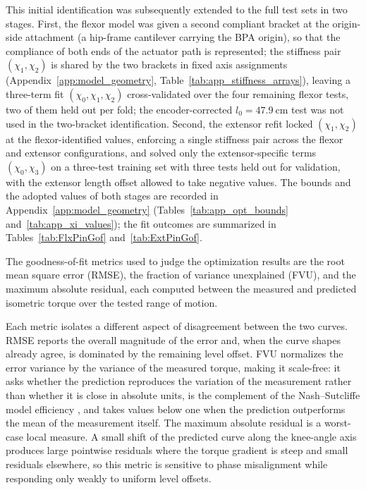 This initial identification was subsequently extended to the full test sets in two stages. First, the flexor model was given a second compliant bracket at the origin-side attachment (a hip-frame cantilever carrying the BPA origin), so that the compliance of both ends of the actuator path is represented; the stiffness pair $(\chi_{1}, \chi_{2})$ is shared by the two brackets in fixed axis assignments (Appendix~\ref{app:model_geometry}, Table~\ref{tab:app_stiffness_arrays}), leaving a three-term fit $(\chi_{0}, \chi_{1}, \chi_{2})$ cross-validated over the four remaining flexor tests, two of them held out per fold; the encoder-corrected $l_{0}=\qty{47.9}{\cm}$ test was not used in the two-bracket identification. Second, the extensor refit locked $(\chi_{1}, \chi_{2})$ at the flexor-identified values, enforcing a single stiffness pair across the flexor and extensor configurations, and solved only the extensor-specific terms $(\chi_{0}, \chi_{3})$ on a three-test training set with three tests held out for validation, with the extensor length offset allowed to take negative values. The bounds and the adopted values of both stages are recorded in Appendix~\ref{app:model_geometry} (Tables~\ref{tab:app_opt_bounds} and~\ref{tab:app_xi_values}); the fit outcomes are summarized in Tables~\ref{tab:FlxPinGof} and~\ref{tab:ExtPinGof}.

The goodness-of-fit metrics used to judge the optimization results are the root mean square error (RMSE), the fraction of variance unexplained (FVU), and the maximum absolute residual, each computed between the measured and predicted isometric torque over the tested range of motion.

Each metric isolates a different aspect of disagreement between the two curves. RMSE reports the overall magnitude of the error and, when the curve shapes already agree, is dominated by the remaining level offset. FVU normalizes the error variance by the variance of the measured torque, making it scale-free: it asks whether the prediction reproduces the variation of the measurement rather than whether it is close in absolute units, is the complement of the Nash--Sutcliffe model efficiency \citep{nash_river_1970}, and takes values below one when the prediction outperforms the mean of the measurement itself. The maximum absolute residual is a worst-case local measure. A small shift of the predicted curve along the knee-angle axis produces large pointwise residuals where the torque gradient is steep and small residuals elsewhere, so this metric is sensitive to phase misalignment while responding only weakly to uniform level offsets.

